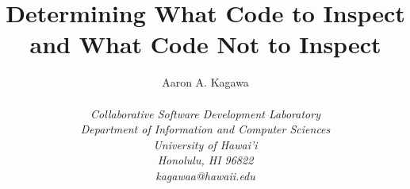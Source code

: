 \documentclass[11pt,twocolumn]{article}
\begin{document}
\title{Determining What Code to Inspect and What Code Not to Inspect}

\author{\protect\begin{tabular}{ccc}
Aaron A. Kagawa \\
\end{tabular}\\
\em  Collaborative Software Development Laboratory \\
\em  Department of Information and Computer Sciences \\
\em  University of Hawai'i \\
\em  Honolulu, HI 96822 \\
\em  kagawaa@hawaii.edu}
\maketitle
\thispagestyle{empty}
\end{document}
